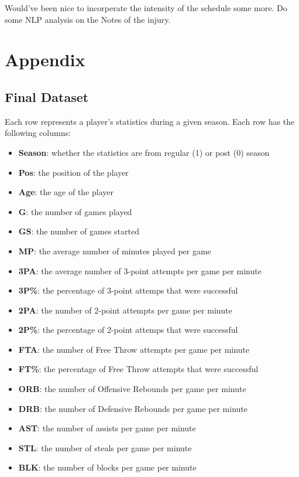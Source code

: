 \documentclass{article}
\begin{document}
Would've been nice to incorperate the intensity of the schedule some more.
Do some NLP analysis on the Notes of the injury.

\newpage
\section*{Appendix}
\label{appendix:start}


\subsection*{Final Dataset}

\label{appendix:finaldataset}
Each row represents a player's statistics during a given season. 
Each row has the following columns:
\begin{itemize}
    \item \textbf{Season}: whether the statistics are from regular (1) or post (0) season
    \item \textbf{Pos}: the position of the player
    \item \textbf{Age}: the age of the player
    \item \textbf{G}: the number of games played
    \item \textbf{GS}: the number of games started
    \item \textbf{MP}: the average number of minutes played per game
    \item \textbf{3PA}: the average number of 3-point attempts per game per minute
    \item \textbf{3P\%}: the percentage of 3-point attemps that were successful
    \item \textbf{2PA}: the number of 2-point attempts per game per minute
    \item \textbf{2P\%}: the percentage of 2-point attemps that were successful
    \item \textbf{FTA}: the number of Free Throw attempts per game per minute
    \item \textbf{FT\%}: the percentage of Free Throw attempts that were successful
    \item \textbf{ORB}: the number of Offensive Rebounds per game per minute
    \item \textbf{DRB}: the number of Defensive Rebounds per game per minute
    \item \textbf{AST}: the number of assists per game per minute
    \item \textbf{STL}: the number of steals per game per minute
    \item \textbf{BLK}: the number of blocks per game per minute

\end{itemize}
\end{document}
